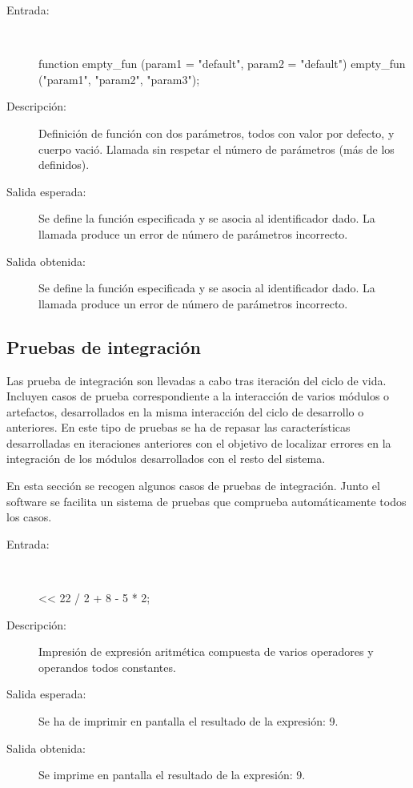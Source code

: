 	\begin{description}
		\item [Entrada:] \hfill \\
\begin{myverbatim}
   function empty_fun (param1 = "default", param2 = "default") { } 
   empty_fun ("param1", "param2", "param3");
\end{myverbatim}
		\item [Descripción:] Definición de función con dos parámetros, todos con valor por defecto, y cuerpo vació. Llamada sin respetar el número de parámetros (más de los definidos).
		\item [Salida esperada:] Se define la función especificada y se asocia al identificador dado. La llamada produce un error de número de parámetros incorrecto.
		\item [Salida obtenida:] Se define la función especificada y se asocia al identificador dado. La llamada produce un error de número de parámetros incorrecto.
	\end{description}

\subsection{Pruebas de integración}
Las prueba de integración son llevadas a cabo tras iteración del ciclo de vida. Incluyen casos de prueba correspondiente a la interacción de varios módulos o artefactos, desarrollados 
en la misma interacción del ciclo de desarrollo o anteriores. En este tipo de pruebas se ha de repasar las características desarrolladas en iteraciones anteriores con el objetivo de localizar errores en la integración 
de los módulos desarrollados con el resto del sistema.

En esta sección se recogen algunos casos de pruebas de integración. Junto el software se facilita un sistema de pruebas que comprueba automáticamente todos los casos.

	\begin{description}
		\item [Entrada:] \hfill \\
\begin{myverbatim}
   << 22 / 2 + 8 - 5 * 2;
\end{myverbatim}
		\item [Descripción:] Impresión de expresión aritmética compuesta de varios operadores y operandos todos constantes.
		\item [Salida esperada:] Se ha de imprimir en pantalla el resultado de la expresión: 9.
		\item [Salida obtenida:] Se imprime en pantalla el resultado de la expresión: 9.
	\end{description}

